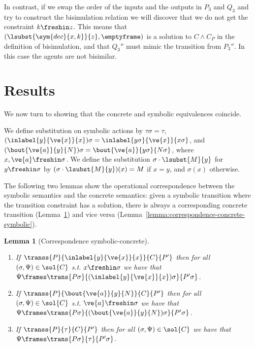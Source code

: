 \documentclass{eptcs}
\newtheorem{lemma}[definition]{Lemma}
\theoremstyle{definition}
\begin{document}
In contrast, if we swap the order of the inputs and the outputs in $P_3$
and $Q_3$ and try to construct the bisimulation relation we will discover that
we do not get the constraint $k \freshin z$. This means that 
$(\lsubst{\sym{dec}{x,k}}{z}, \emptyframe)$ is a solution
to $C \wedge C_P$ in the definition of bisimulation, and that $Q_3''$ must
mimic the transition from $P_3''$. In this case the agents are not bisimilar.

\section{Results}
\label{sec:results}
We now turn to showing that the concrete and symbolic equivalences coincide.


We define substitution on symbolic actions by
$\tau\sigma = \tau$,
$(\inlabel{y}{\ve{x}}{x})\sigma = \inlabel{y\sigma}{\ve{x}}{x\sigma}$, and
$(\bout{\ve{a}}{y}{N})\sigma = \bout{\ve{a}}{y\sigma}{N\sigma}$,
where $x,\ve{a} \freshin \sigma$.
We define the substitution $\sigma \cdot \lsubst{M}{y}$ for $y \freshin \sigma$
by
$(\sigma\cdot\lsubst{M}{y})(x) = M$ if $x=y$, and $\sigma(x)$ otherwise.


The following two lemmas show the operational correspondence between the
symbolic semantics and the concrete semantics: given a symbolic transition
where the transition constraint has a solution, there is
always a corresponding concrete transition
(Lemma~\ref{lemma:correspondence-symbolic-concrete}) and vice versa
(Lemma~\ref{lemma:correspondence-concrete-symbolic}).

\begin{lemma}[Correspondence symbolic-concrete]\mbox{}\\
\label{lemma:correspondence-symbolic-concrete}
\vspace{-1\baselineskip}
\begin{enumerate}
 \item If $\transs{P}{\inlabel{y}{\ve{x}}{x}}{C}{P'}$ then for all $(\sigma,
\Psi) \in
\sol{C}$ s.t. $x \freshin \sigma$
we have that $\Psi \frames
\trans{P\sigma}{(\inlabel{y}{\ve{x}}{x})\sigma}{P'\sigma}$.
\item If $\transs{P}{\bout{\ve{a}}{y}{N}}{C}{P'}$ then for all $(\sigma, \Psi)
\in \sol{C}$ s.t. $\ve{a} \freshin
\sigma$ we have that $\Psi \frames
\trans{P\sigma}{(\bout{\ve{a}}{y}{N})\sigma}{P'\sigma}$.
\item If $\transs{P}{\tau}{C}{P'}$ then for all $(\sigma,
\Psi) \in \sol{C}$ we have that $\Psi
\frames
\trans{P\sigma}{\tau}{P'\sigma}$.
\end{enumerate}
\end{lemma}
\end{document}
